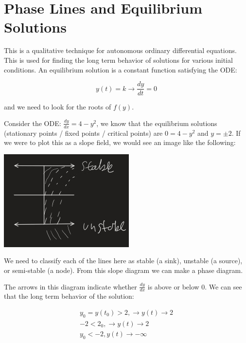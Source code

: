 \section{}
\section{Phase Lines and Equilibrium Solutions}

  This is a qualitative technique for autonomous ordinary differential equations. This is used for finding the long term behavior of solutions for various initial conditions. An equilibrium solution is a constant function satisfying the ODE:

  \begin{equation}
    y(t)=k\to\frac{dy}{dt}=0
  \end{equation}

  and we need to look for the roots of $f(y)$.

  \begin{problem}
    Consider the ODE: $\frac{dy}{dx}=4-y^2$, we know that the equilibrium solutions (stationary points / fixed points / critical points) are $0=4-y^2$ and $y=\pm2$.  If we were to plot this as a slope field, we would see an image like the following:
  
    \begin{center}
      \includegraphics{resource/images/2.7 Example 1.jpg}
    \end{center}

    We need to classify each of the lines here as stable (a sink), unstable (a source), or semi-stable (a node). From this slope diagram we can make a phase diagram.

      

    The arrows in this diagram indicate whether $\frac{dy}{dx}$ is above or below $0$. We can see that the long term behavior of the solution:

    \begin{equation}
      \begin{aligned}
        y_0 = y(t_0) > 2,\to y(t)\to 2\\
        - 2 < 2_0,\to y(t)\to 2\\
        y_0 <- 2, y(t)\to -\infty\\
      \end{aligned}
    \end{equation}
  \end{problem}

